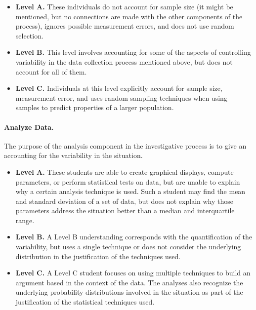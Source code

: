\documentclass[
]{book}
\providecommand{\tightlist}{%
  \setlength{\itemsep}{0pt}\setlength{\parskip}{0pt}}
\theoremstyle{definition}
\theoremstyle{definition}
\theoremstyle{definition}
\theoremstyle{definition}
\theoremstyle{remark}
\begin{document}
\begin{itemize}
\tightlist
\item
  \textbf{Level A.} These individuals do not account for sample size (it might be mentioned, but no connections are made with the other components of the process), ignores possible measurement errors, and does not use random selection.
\item
  \textbf{Level B.} This level involves accounting for some of the aspects of controlling variability in the data collection process mentioned above, but does not account for all of them.
\item
  \textbf{Level C.} Individuals at this level explicitly account for sample size, measurement error, and uses random sampling techniques when using samples to predict properties of a larger population.
\end{itemize}

\hypertarget{analyze-data.}{%
\paragraph*{Analyze Data.}\label{analyze-data.}}

The purpose of the analysis component in the investigative process is to give an accounting for the variability in the situation.

\begin{itemize}
\tightlist
\item
  \textbf{Level A.} These students are able to create graphical displays, compute parameters, or perform statistical tests on data, but are unable to explain why a certain analysis technique is used. Such a student may find the mean and standard deviation of a set of data, but does not explain why those parameters address the situation better than a median and interquartile range.
\item
  \textbf{Level B.} A Level B understanding corresponds with the quantification of the variability, but uses a single technique or does not consider the underlying distribution in the justification of the techniques used.
\item
  \textbf{Level C.} A Level C student focuses on using multiple techniques to build an argument based in the context of the data. The analyses also recognize the underlying probability distributions involved in the situation as part of the justification of the statistical techniques used.
\end{itemize}
\end{document}

